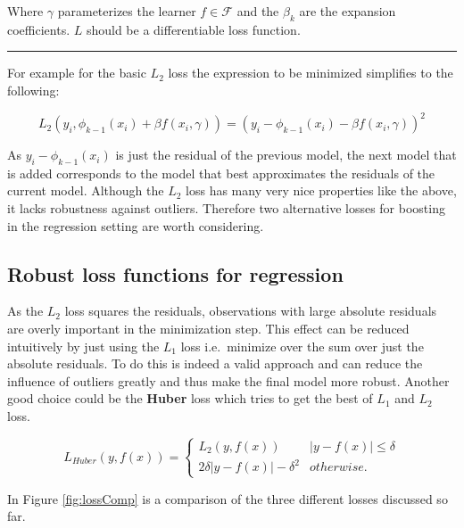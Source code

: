 \documentclass[
]{book}
\begin{document}
Where \(\gamma\) parameterizes the learner \(f \in \mathcal{F}\) and the \(\beta_k\) are the expansion coefficients. \(L\) should be a differentiable loss function.

\begin{center}\rule{0.5\linewidth}{0.5pt}\end{center}

For example for the basic \(L_2\) loss the expression to be minimized simplifies to the following:

\[
L_2(y_i,\phi_{k-1}(x_i) + \beta f(x_i,\gamma)) = (y_i - \phi_{k-1}(x_i) - \beta f(x_i,\gamma))^2
\]

As \(y_i - \phi_{k-1}(x_i)\) is just the residual of the previous model, the next model that is added corresponds to the model that best approximates the residuals of the current model. Although the \(L_2\) loss has many very nice properties like the above, it lacks robustness against outliers. Therefore two alternative losses for boosting in the regression setting are worth considering.

\hypertarget{robust-loss-functions-for-regression}{%
\subsection{Robust loss functions for regression}\label{robust-loss-functions-for-regression}}

As the \(L_2\) loss squares the residuals, observations with large absolute residuals are overly important in the minimization step. This effect can be reduced intuitively by just using the \(L_1\) loss i.e.~minimize over the sum over just the absolute residuals. To do this is indeed a valid approach and can reduce the influence of outliers greatly and thus make the final model more robust. Another good choice could be the \textbf{Huber} loss which tries to get the best of \(L_1\) and \(L_2\) loss.\citep{elements}

\begin{equation}
  L_{Huber}(y,f(x)) = \begin{cases}L_2(y,f(x)) & |y-f(x)| \leq \delta \\
  2\delta |y-f(x)| - \delta^2 & otherwise.
  \end{cases}
  \label{eq:huberLoss}
\end{equation}

In Figure \ref{fig:lossComp} is a comparison of the three different losses discussed so far.\citep{elements}
\end{document}
